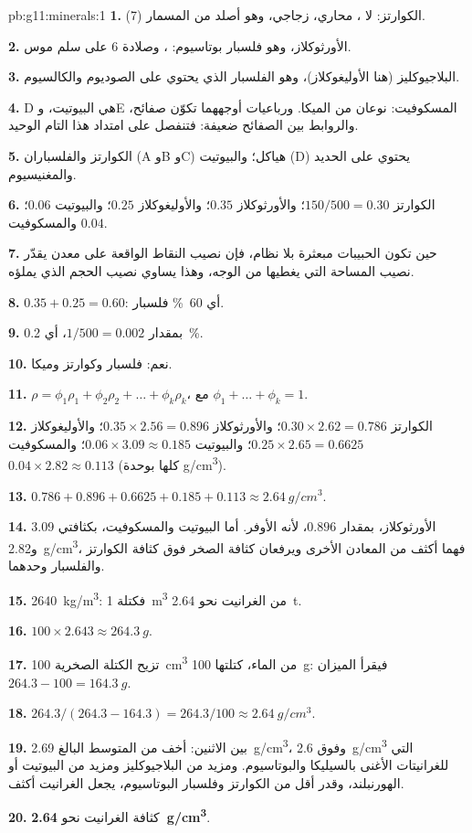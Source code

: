 \begin{solution}{pb:g11:minerals:1}
\textbf{1.} الكوارتز: لا ،  محاري،  زجاجي، وهو أصلد
من المسمار (7).

\textbf{2.} الأورثوكلاز، وهو فلسبار بوتاسيوم: ، وصلادة 6 على
سلم موس.

\textbf{3.} البلاجيوكليز (هنا الأوليغوكلاز)، وهو الفلسبار الذي يحتوي على الصوديوم
والكالسيوم.

\textbf{4.} D هي البيوتيت، وE المسكوفيت: نوعان من الميكا. ورباعيات أوجههما تكوّن
صفائح، والروابط بين الصفائح ضعيفة: فتنفصل على امتداد هذا 
التام الوحيد.

\textbf{5.} الكوارتز والفلسباران (A وB وC) هياكل؛ والبيوتيت
(D) يحتوي على الحديد والمغنيسيوم.

\textbf{6.} الكوارتز $150/500 = 0.30$؛ والأورثوكلاز $0.35$؛ والأوليغوكلاز $0.25$؛
والبيوتيت $0.06$؛ والمسكوفيت $0.04$.

\textbf{7.} حين تكون الحبيبات مبعثرة بلا نظام، فإن نصيب النقاط الواقعة
على معدن يقدّر نصيب المساحة التي يغطيها من الوجه، وهذا يساوي
نصيب الحجم الذي يملؤه.

\textbf{8.} $0.35 + 0.25 = 0.60$: أي \qty{60}{\percent} فلسبار.

\textbf{9.} بمقدار $1/500 = 0.002$، أي \qty{0.2}{\percent}.

\textbf{10.} نعم: فلسبار وكوارتز وميكا.

\textbf{11.} $\rho = \phi_1 \rho_1 + \phi_2 \rho_2 + \dots + \phi_k \rho_k$،
مع $\phi_1 + \dots + \phi_k = 1$.

\textbf{12.} الكوارتز $0.30 \times 2.62 = 0.786$؛ والأورثوكلاز $0.35 \times 2.56 =
0.896$؛ والأوليغوكلاز $0.25 \times 2.65 = 0.6625$؛ والبيوتيت $0.06 \times 3.09
\approx 0.185$؛ والمسكوفيت $0.04 \times 2.82 \approx 0.113$ (كلها
بوحدة \unit{g/cm^3}).

\textbf{13.} $0.786 + 0.896 + 0.6625 + 0.185 + 0.113 \approx
\qty{2.64}{g/cm^3}$.

\textbf{14.} الأورثوكلاز، بمقدار $0.896$، لأنه الأوفر. أما البيوتيت
والمسكوفيت، بكثافتي \qty{3.09}{} و\qty{2.82}{g/cm^3}، فهما أكثف من
المعادن الأخرى ويرفعان كثافة الصخر فوق كثافة الكوارتز
والفلسبار وحدهما.

\textbf{15.} \qty{2640}{kg/m^3}: فكتلة \qty{1}{m^3} من الغرانيت
نحو \qty{2.64}{t}.

\textbf{16.} $100 \times 2.643 \approx \qty{264.3}{g}$.

\textbf{17.} تزيح الكتلة الصخرية \qty{100}{cm^3} من الماء، كتلتها
\qty{100}{g}: فيقرأ الميزان $264.3 - 100 = \qty{164.3}{g}$.

\textbf{18.} $264.3/(264.3 - 164.3) = 264.3/100 \approx \qty{2.64}{g/cm^3}$.

\textbf{19.} بين الاثنين: أخف من المتوسط البالغ \qty{2.69}{g/cm^3}،
وفوق \qty{2.6}{g/cm^3} التي للغرانيتات الأغنى بالسيليكا والبوتاسيوم.
ومزيد من البلاجيوكليز ومزيد من البيوتيت أو الهورنبلند، وقدر أقل من الكوارتز
وفلسبار البوتاسيوم، يجعل الغرانيت أكثف.

\textbf{20.} كثافة الغرانيت نحو
\textbf{\qty{2.64}{g/cm^3}}.
\end{solution}
